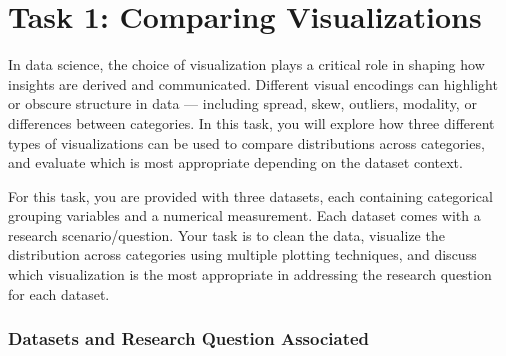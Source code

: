 \documentclass[11pt]{article}
\begin{document}



\section*{Task 1: Comparing Visualizations}

In data science, the choice of visualization plays a critical role in shaping how insights are derived and communicated. Different visual encodings can highlight or obscure structure in data — including spread, skew, outliers, modality, or differences between categories. In this task, you will explore how three different types of visualizations can be used to compare distributions across categories, and evaluate which is most appropriate depending on the dataset context.

For this task, you are provided with three datasets, each containing categorical grouping variables and a numerical measurement. Each dataset comes with a research scenario/question. Your task is to clean the data, visualize the distribution across categories using multiple plotting techniques, and discuss which visualization is the most appropriate in addressing the research question for each dataset.

\subsubsection*{Datasets and Research Question Associated}
\end{document}
